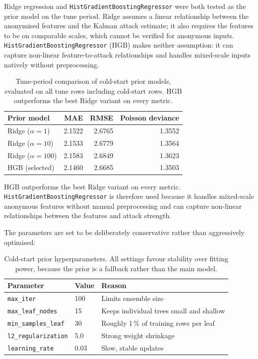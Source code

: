\documentclass[11pt]{article}
\begin{document}
Ridge regression and \texttt{HistGradientBoostingRegressor} were both tested
as the prior model on the tune period.
Ridge assumes a linear relationship between the anonymised features and
the Kalman attack estimate; it also requires the features to be on comparable
scales, which cannot be verified for anonymous inputs.
\texttt{HistGradientBoostingRegressor} (HGB) makes neither assumption: it can
capture non-linear feature-to-attack relationships and handles mixed-scale
inputs natively without preprocessing.

\begin{table}[h]
\centering
\begin{tabular}{lrrr}
\toprule
Prior model & MAE & RMSE & Poisson deviance \\
\midrule
Ridge ($\alpha=1$)   & 2.1522 & 2.6765 & 1.3552 \\
Ridge ($\alpha=10$)  & 2.1533 & 2.6779 & 1.3564 \\
Ridge ($\alpha=100$) & 2.1583 & 2.6849 & 1.3623 \\
HGB (selected)       & 2.1460 & 2.6685 & 1.3503 \\
\bottomrule
\end{tabular}
\caption{Tune-period comparison of cold-start prior models, evaluated on all
tune rows including cold-start rows. HGB outperforms the best Ridge variant
on every metric.}
\end{table}

HGB outperforms the best Ridge variant on every metric.
\texttt{HistGradientBoostingRegressor} is therefore used because it handles
mixed-scale anonymous features without manual preprocessing and can capture
non-linear relationships between the features and attack strength.

The parameters are set to be deliberately conservative rather than
aggressively optimised:

\begin{table}[h]
\centering
\begin{tabular}{llp{6.5cm}}
\toprule
Parameter & Value & Reason \\
\midrule
\texttt{max\_iter}         & 100  & Limits ensemble size \\
\texttt{max\_leaf\_nodes}  & 15   & Keeps individual trees small and shallow \\
\texttt{min\_samples\_leaf}& 30   & Roughly 1\,\% of training rows per leaf \\
\texttt{l2\_regularization}& 5.0  & Strong weight shrinkage \\
\texttt{learning\_rate}    & 0.03 & Slow, stable updates \\
\bottomrule
\end{tabular}
\caption{Cold-start prior hyperparameters. All settings favour stability over
fitting power, because the prior is a fallback rather than the main model.}
\end{table}
\end{document}
